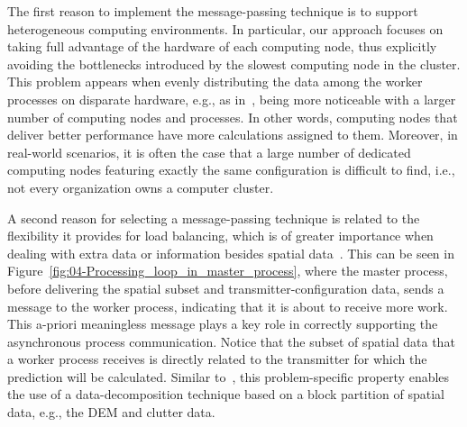 The first reason to implement the message-passing technique is to
support heterogeneous computing environments. In particular, our approach
focuses on taking full advantage of the hardware of each computing
node, thus explicitly avoiding the bottlenecks introduced by the slowest
computing node in the cluster. This problem appears when evenly distributing
the data among the worker processes on disparate hardware, e.g., as
in~\cite{Akhter-GRASS_GIS_on_high_performance_computing_with_MPI_OpenMP_and_Ninf-G:2010,Huang-Explorations_of_the_implementation_of_a_parallel_IDW_algorithm_in_a_Linux_cluster:2011},
being more noticeable with a larger number of computing nodes and
processes. In other words, computing nodes that deliver better performance
have more calculations assigned to them. Moreover, in real-world scenarios,
it is often the case that a large number of dedicated computing nodes
featuring exactly the same configuration is difficult to find, i.e.,
not every organization owns a computer cluster.

A second reason for selecting a message-passing technique is related
to the flexibility it provides for load balancing, which is of greater
importance when dealing with extra data or information besides spatial
data~\cite{Hawick_Distributed_frameworks_and_parallel_algorithms_for_processing_large_scala_geographic_data:2003}.
This can be seen in Figure~\ref{fig:04-Processing_loop_in_master_process},
where the master process, before delivering the spatial subset and
transmitter-configuration data, sends a message to the worker process,
indicating that it is about to receive more work. This a-priori meaningless
message plays a key role in correctly supporting the asynchronous
process communication. Notice that the subset of spatial data that
a worker process receives is directly related to the transmitter for
which the prediction will be calculated. Similar to~\cite{Tabik-High_performance_three_horizon_composition_algorithm_for_large_scale_terrains:2011,Tabik-Optimal_tilt_and_orientation_maps_a_multi_algorithm_approach_for_heterogeneous_multicore_GPU_systems:2013},
this problem-specific property enables the use of a data-decomposition
technique based on a block partition of spatial data, e.g., the DEM
and clutter data.

